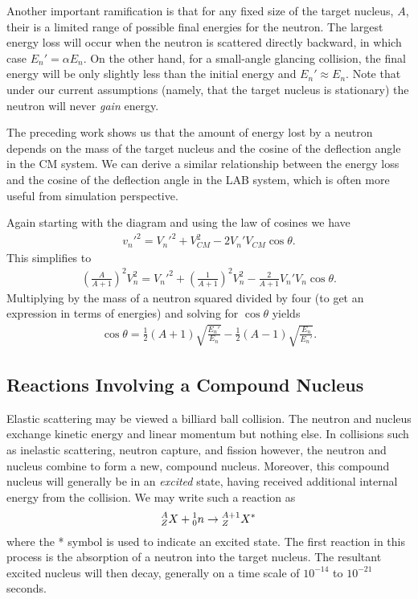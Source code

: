 \documentclass[11pt]{article}
\newcommand\leftidx[3]{{\vphantom{#2}}#1#2#3}
\begin{document}
Another important ramification is that for any fixed size of the target nucleus, \(A\), their is a limited range of possible final energies for the neutron.  The largest energy loss will occur when the neutron is scattered directly backward, in which case \(E_n' = \alpha E_n\).  On the other hand, for a small-angle glancing collision, the final energy will be only slightly less than the initial energy and \(E_n' \approx E_n\).  Note that under our current assumptions (namely, that the target nucleus is stationary) the neutron will never \emph{gain} energy.

The preceding work shows us that the amount of energy lost by a neutron depends on the mass of the target nucleus and the cosine of the deflection angle in the CM system.  We can derive a similar relationship between the energy loss and the cosine of the deflection angle in the LAB system, which is often more useful from simulation perspective.

Again starting with the diagram and using the law of cosines we have
\begin{align}
  v_n'^2 = V_n'^2 + V_{CM}^2 - 2 V_n' V_{CM} \cos\theta.
\end{align}
This simplifies to 
\begin{align}
  \left( \frac{A}{A+1} \right)^2 V_n^2 = V_n'^2 + \left( \frac{1}{A+1} \right)^2 V_n^2 - \frac{2}{A+1} V_n' V_n \cos\theta.
\end{align}
Multiplying by the mass of a neutron squared divided by four (to get an expression in terms of energies) and solving for \(\cos\theta\) yields
\begin{align}
  \cos\theta = \frac{1}{2}\left( A+1 \right) \sqrt{\frac{E_n'}{E_n}}
             - \frac{1}{2}\left( A-1 \right) \sqrt{\frac{E_n}{E_n'}}.
\end{align}

\subsection{Reactions Involving a Compound Nucleus}
\label{sec:orgheadline5}
Elastic scattering may be viewed a billiard ball collision.  The neutron and nucleus exchange kinetic energy and linear momentum but nothing else.  In collisions such as inelastic scattering, neutron capture, and fission however, the neutron and nucleus combine to form a new, compound nucleus.  Moreover, this compound nucleus will generally be in an \emph{excited} state, having received additional internal energy from the collision.  We may write such a reaction as
\begin{align}
  \leftidx{^A_Z}{X}{} + \leftidx{^1_0}{n}{} 
  \rightarrow \leftidx{^{A+1}_Z}{X}{^*}
\end{align}
where the * symbol is used to indicate an excited state.  The first reaction in this process is the absorption of a neutron into the target nucleus.  The resultant excited nucleus will then decay, generally on a time scale of \(10^{-14}\) to \(10^{-21}\) seconds.
\end{document}
